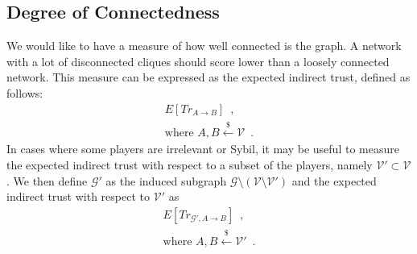 \subsection{Degree of Connectedness}
  We would like to have a measure of how well connected is the graph. A network with a lot of disconnected cliques should
  score lower than a loosely connected network. This measure can be expressed as the expected indirect trust, defined as
  follows:
  \begin{gather*}
    E\left[Tr_{A \rightarrow B}\right] \enspace, \\
    \mbox{where } A, B \overset{\$}{\leftarrow} \mathcal{V} \enspace.
  \end{gather*}
  In cases where some players are irrelevant or Sybil, it may be useful to measure the expected indirect trust with respect to
  a subset of the players, namely $\mathcal{V}' \subset \mathcal{V}$. We then define $\mathcal{G}'$ as the induced subgraph
  $\mathcal{G} \setminus \left(\mathcal{V} \setminus \mathcal{V}'\right)$ and the expected indirect trust with respect to
  $\mathcal{V}'$ as
  \begin{gather*}
    E\left[Tr_{\mathcal{G}', A \rightarrow B}\right] \enspace, \\
    \mbox{where } A, B \overset{\$}{\leftarrow} \mathcal{V}' \enspace.
  \end{gather*}

